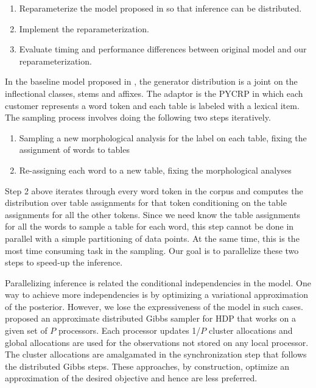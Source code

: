 \documentclass{article}
\begin{document}
\begin{enumerate}[1.]
\item Reparameterize the model proposed in \cite{goldwater2011} so
  that inference can be distributed.
\item Implement the reparameterization.
\item Evaluate timing and performance differences between original
  model and our reparameterization.
\end{enumerate}

In the baseline model proposed in \cite{goldwater2011}, the 
generator distribution is a joint on the inflectional classes, stems 
and affixes. The adaptor is the PYCRP in which each customer represents 
a word token and each table is labeled with a lexical item. The sampling 
process involves doing the following two steps iteratively.

\begin{enumerate}[1.]
\item Sampling a new morphological analysis for the label on each table,
fixing the assignment of words to tables
\item Re-assigning each word to a new table, fixing the morphological analyses
\end{enumerate}

Step 2 above iterates through every word token in the corpus and computes
the distribution over table assignments for that token conditioning on 
the table assignments for all the other tokens. Since we need know the 
table assignments for all the words to sample a table for each word, this
step cannot be done in parallel with a simple partitioning of data points. 
At the same time, this is the most time consuming task in the sampling. 
Our goal is to parallelize these two steps to speed-up the inference.

Parallelizing inference is related the conditional independencies in the 
model. One way to achieve more independencies is by optimizing a variational 
approximation of the posterior. However, we lose the expressiveness of the 
model in such cases. \cite{asuncion2008asynchronous} proposed an approximate
distributed Gibbs sampler for HDP that works on a given set of $P$ processors.
Each processor updates 1/$P$ cluster allocations and global allocations are 
used for the observations not stored on any local processor. The cluster
allocations are amalgamated in the synchronization step that follows the 
distributed Gibbs steps. These approaches, by construction, optimize an 
approximation of the desired objective and hence are less preferred.
\end{document}
